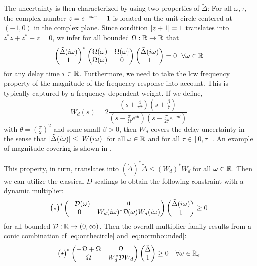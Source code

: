 The uncertainty is then characterized by using two properties of $\tilde \Delta$: For all 
$\omega,\tau$, the complex number $z=e^{-i\omega{\tau}}-1$ is located on the unit circle centered 
at $(-1,0)$ in the complex plane. Since condition $\displaystyle \left|z+1\right|=1$ translates into $z^*z+z^*+z=0$, 
we infer for all bounded $\Omega:\mathbb{R}\to\mathbb{R}$ that
\begin{equation}
\begin{pmatrix}\tilde{\Delta}(i\omega)\\1\end{pmatrix}^*\begin{pmatrix}\Omega(\omega) &\Omega(\omega)\\ \Omega(\omega) &0\end{pmatrix}
\begin{pmatrix}\tilde{\Delta}(i\omega)\\1\end{pmatrix} = 0\ \ \forall\omega\in\mathbb{R}
\label{eq:onthecircle}
\end{equation}
for any delay time $\tau\in\mathbb{R}$. Furthermore, we need to take the low frequency property of the 
magnitude of the frequency response into account. This is typically captured by a frequency dependent 
weight. If we define,
\begin{equation*}
W_d(s)= 2\frac{(s+ \frac{4}{\pi\bar{\tau}}) (s+ \frac{\beta}{\bar{\tau}})}%
{(s-\frac{\pi}{2\bar{\tau}}e^{i\theta})(s-\frac{\pi}{2\bar{\tau}}e^{-i\theta})}
\end{equation*}
with $\theta=\left( \frac{\pi}{2}\right)^2$ and some small $\beta>0$, then $W_d$ covers the delay 
uncertainty in the sense that $|\tilde{\Delta}(i\omega)|\leq |W(i\omega)|$ for all $\omega\in\mathbb{R}$ and 
for all $\tau\in [0,\bar{\tau}]$. An example of magnitude covering is shown in .

This property, in turn, translates into $(\tilde{\Delta})^*\tilde{\Delta}\leq (W_d)^*W_d$ for all 
$\omega\in\mathbb{R}$. Then we can utilize the classical $D$-scalings to obtain the following constraint 
with a dynamic multiplier:
\begin{equation}
\begin{pmatrix}\star\end{pmatrix}^*\begin{pmatrix}-\mathcal{D}(\omega) &0\\0 &W_d(i\omega)^*\mathcal{D}(\omega)W_d(i\omega)\end{pmatrix}
\begin{pmatrix}\tilde{\Delta}(i\omega)\\1\end{pmatrix} \geq 0
\label{eq:normbounded}
\end{equation}
for all bounded $\mathcal{D}:\mathbb{R}\to (0,\infty)$. Then the overall multiplier family results from a 
conic combination of \eqref{eq:onthecircle} and \eqref{eq:normbounded}:
\[
\begin{pmatrix}\star\end{pmatrix}^*\begin{pmatrix}-\mathcal{D}+\Omega &\Omega\\
\Omega &W_d^*\mathcal{D}W_d\end{pmatrix}\begin{pmatrix}\tilde{\Delta}\\1\end{pmatrix}
\geq 0 \quad \forall\omega\in\mathbb{R}_e
\]